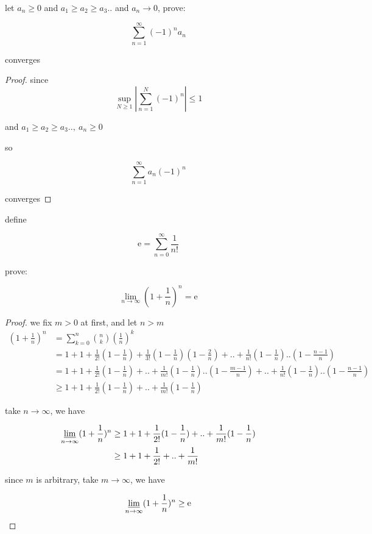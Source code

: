 \begin{exercise}
    let $a_n \ge 0$ and $a_1 \ge a_2 \ge a_3 .. $ and $a_n \to 0$, prove:

    \[
        \sum_{n=1}^{\infty}(-1)^n a_n
    \]

    converges
\end{exercise}

\begin{proof}
    since 
    \[
        \sup_{N \ge 1}\left| \sum_{n=1}^{N} (-1)^n \right| \le 1
    \] 

    and $a_1 \ge a_2 \ge a_3 ..,\: a_n \ge 0$

    so

    \[
        \sum_{n=1}^{\infty}a_n(-1)^n  
    \]

    converges
\end{proof}

\begin{exercise}
    define  

    \[
        \text{e} = \sum_{n=0}^{\infty}\frac{1}{n!}
    \]

    prove:

    \[
        \lim_{n \to \infty}(1+\frac{1}{n})^n = \text{e}
    \]
\end{exercise}

\begin{proof}
    we fix $m > 0$ at first, and let $n > m$
    \begin{align*}
        (1+\frac{1}{n})^{n} &= \sum_{k=0}^{n}\binom{n}{k}(\frac{1}{n})^k \\
        &= 1 + 1 + \frac{1}{2!}(1-\frac{1}{n}) +\frac{1}{3!}(1-\frac{1}{n})(1-\frac{2}{n}) + .. + \frac{1}{n!}(1-\frac{1}{n})..(1-\frac{n-1}{n}) \\
        &= 1 + 1 + \frac{1}{2!}(1-\frac{1}{n}) + .. + \frac{1}{m!}(1-\frac{1}{n})..(1-\frac{m-1}{n}) + .. + \frac{1}{n!}(1-\frac{1}{n})..(1-\frac{n-1}{n})\\
        & \ge 1 + 1 + \frac{1}{2!}(1-\frac{1}{n}) + .. + \frac{1}{m!}(1-\frac{1}{n})
    \end{align*}

    take $n \to \infty$, we have

    \begin{align*}
        \varliminf_{n \to \infty}(1+\frac{1}{n})^n &\ge 1 + 1 + \frac{1}{2!}(1-\frac{1}{n}) + .. + \frac{1}{m!}(1-\frac{1}{n}) \\
        &\ge 1 + 1 + \frac{1}{2!} + .. + \frac{1}{m!}
    \end{align*}

    since $m$ is arbitrary, take $m \to \infty$, we have

    \[
        \varliminf_{n \to \infty}(1+\frac{1}{n})^n \ge \text{e}
    \]
\end{proof}

